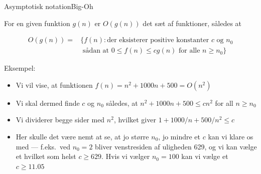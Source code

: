 \documentclass[aspectratio=1610]{beamer}
\begin{document}
\begin{frame}{Asymptotisk notation}{Big-Oh}
    \begin{definition}[Big-Oh, $O$]
        For en given funktion $g(n)$ er $O(g(n))$ det sæt af funktioner, således
        at

        \vspace{-\abovedisplayskip}
        \begin{align*}
            O(g(n)){} =&\{ f(n) : \text{der eksisterer positive konstanter } c
                \text{~og~} n_0 \\
                       &\text{~sådan at~} 0 \leq f(n) \leq cg(n) \text{~for
                   alle~} n \geq n_0 \}
        \end{align*}
    \end{definition}

    Eksempel:
    \pause
    \begin{itemize}[<+->]
        \small
        \item Vi vil vise, at funktionen $f(n) = n^2 + 1000n + 500 = O(n^2)$
        \item Vi skal dermed finde $c$ og $n_0$ således, at $n^2 + 1000n + 500
            \leq cn^2$ for all $n \geq n_0$
        \item Vi dividerer begge sider med $n^2$, hvilket giver $1 + 1000/n +
            500/n^2 \leq c$
        \item Her skulle det være nemt at se, at jo større $n_0$, jo mindre et $c$
            kan vi klare os med --- f.eks.\ ved $n_0 = 2$ bliver venstresiden af
            uligheden 629, og vi kan vælge et hvilket som helst $c \geq 629$.
            Hvis vi vælger $n_0 = 100$ kan vi vælge et $c \geq 11.05$
    \end{itemize}
\end{frame}
\end{document}
